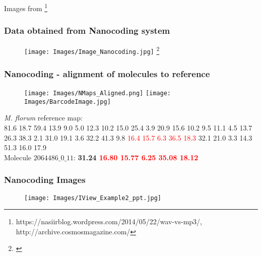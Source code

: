 \documentclass[10pt,dvipsnames,table]{beamer}
\begin{document}
\begin{frame}
\begin{columns}[t]
\begin{column}{0.5\textwidth}
\end{column}
\end{columns}
{\tiny{Images from \footnote{\tiny{https://nasiirblog.wordpress.com/2014/05/22/wav-vs-mp3/, http://archive.cosmosmagazine.com/}} }}
\end{frame}


\begin{frame}
\frametitle{Data obtained from Nanocoding system}
\begin{figure}[T]
\texttt{[image: Images/Image\_Nanocoding.jpg]} \footnote{\tiny{\cite{Kounovsky_etal_2013_Macromolecules}}}
\end{figure}

\note{}
\end{frame}

\begin{frame}
\frametitle{Nanocoding - alignment of molecules to reference}
\vspace{-1cm}
\begin{figure}[t]
\texttt{[image: Images/NMaps\_Aligned.png]}
\hspace{1cm}
\texttt{[image: Images/BarcodeImage.jpg]}
\end{figure}

{\emph{M. florum}} reference map: \\
{\footnotesize{81.6 18.7 59.4 13.9 9.0 5.0 12.3 10.2 15.0 25.4 3.9 20.9 15.6 10.2 9.5 11.1 4.5 
13.7 26.3 38.3 2.1 31.0 19.1 3.6 32.2 41.3 9.8}} \textcolor{Red}{16.4 15.7 6.3 36.5 18.3} {\footnotesize{32.1 21.0 
3.3 14.3 51.3 16.0 17.9}} \\
\vspace{0.5cm}
Molecule {\small{$2064486\_0\_11$}}: {\bf{31.24 \textcolor{Red}{16.80  15.77  6.25  35.08  18.12}}}


\end{frame}

\begin{frame}
\frametitle{Nanocoding Images}
\begin{center}
\begin{figure}[H]
\texttt{[image: Images/IView\_Example2\_ppt.jpg]}
\end{figure}
\end{center}
\end{frame}
\end{document}
